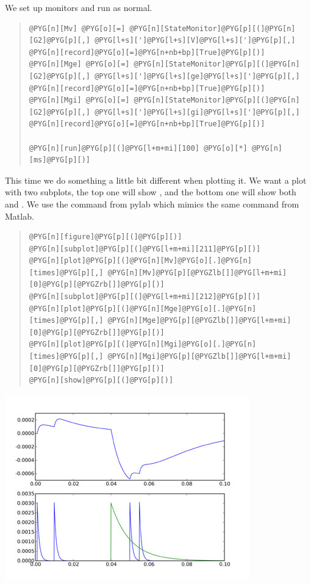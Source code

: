 \documentclass[letterpaper,10pt,english]{manual}
\begin{document}
We set up monitors and run as normal.
\begin{quote}

\begin{Verbatim}[commandchars=@\[\]]
@PYG[n][Mv] @PYG[o][=] @PYG[n][StateMonitor]@PYG[p][(]@PYG[n][G2]@PYG[p][,] @PYG[l+s][']@PYG[l+s][V]@PYG[l+s][']@PYG[p][,] @PYG[n][record]@PYG[o][=]@PYG[n+nb+bp][True]@PYG[p][)]
@PYG[n][Mge] @PYG[o][=] @PYG[n][StateMonitor]@PYG[p][(]@PYG[n][G2]@PYG[p][,] @PYG[l+s][']@PYG[l+s][ge]@PYG[l+s][']@PYG[p][,] @PYG[n][record]@PYG[o][=]@PYG[n+nb+bp][True]@PYG[p][)]
@PYG[n][Mgi] @PYG[o][=] @PYG[n][StateMonitor]@PYG[p][(]@PYG[n][G2]@PYG[p][,] @PYG[l+s][']@PYG[l+s][gi]@PYG[l+s][']@PYG[p][,] @PYG[n][record]@PYG[o][=]@PYG[n+nb+bp][True]@PYG[p][)]

@PYG[n][run]@PYG[p][(]@PYG[l+m+mi][100] @PYG[o][*] @PYG[n][ms]@PYG[p][)]
\end{Verbatim}
\end{quote}

This time we do something a little bit different when plotting it. We want
a plot with two subplots, the top one will show , and the bottom one will
show both  and . We use the  command from pylab which mimics the
same command from Matlab.
\begin{quote}

\begin{Verbatim}[commandchars=@\[\]]
@PYG[n][figure]@PYG[p][(]@PYG[p][)]
@PYG[n][subplot]@PYG[p][(]@PYG[l+m+mi][211]@PYG[p][)]
@PYG[n][plot]@PYG[p][(]@PYG[n][Mv]@PYG[o][.]@PYG[n][times]@PYG[p][,] @PYG[n][Mv]@PYG[p][@PYGZlb[]]@PYG[l+m+mi][0]@PYG[p][@PYGZrb[]]@PYG[p][)]
@PYG[n][subplot]@PYG[p][(]@PYG[l+m+mi][212]@PYG[p][)]
@PYG[n][plot]@PYG[p][(]@PYG[n][Mge]@PYG[o][.]@PYG[n][times]@PYG[p][,] @PYG[n][Mge]@PYG[p][@PYGZlb[]]@PYG[l+m+mi][0]@PYG[p][@PYGZrb[]]@PYG[p][)]
@PYG[n][plot]@PYG[p][(]@PYG[n][Mgi]@PYG[o][.]@PYG[n][times]@PYG[p][,] @PYG[n][Mgi]@PYG[p][@PYGZlb[]]@PYG[l+m+mi][0]@PYG[p][@PYGZrb[]]@PYG[p][)]
@PYG[n][show]@PYG[p][(]@PYG[p][)]
\end{Verbatim}
\end{quote}

\includegraphics{2b.jpg}
\end{document}
